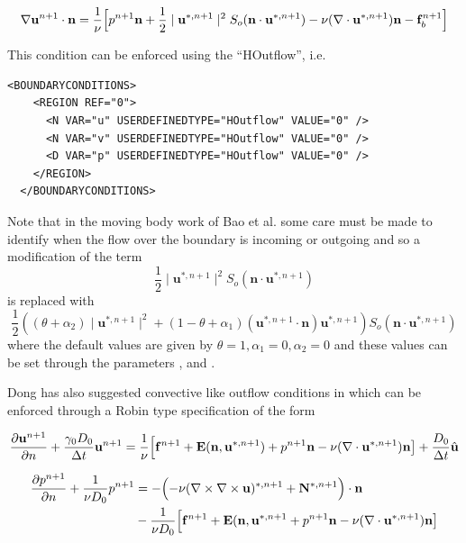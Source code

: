  \begin{equation}
 \nabla\mathbf{u}^{n+1}\cdot\mathbf{n}=\frac{1}{\nu}\Bigl[p^{n+1}\mathbf{n}+\frac{1}{2}
   \mid \mathbf{u}^{*,n+1} \mid^2 S_o(\mathbf{n}\cdot
   \mathbf{u}^{*,n+1})-\nu(\nabla\cdot\mathbf{u}^{*,n+1})\mathbf{n}-\mathbf{f}_b^{n+1}\Bigr]
 \end{equation}

This condition can be enforced using the  ``HOutflow'', i.e. 
\begin{lstlisting}[style=XMLStyle]
  <BOUNDARYCONDITIONS>
    <REGION REF="0">
      <N VAR="u" USERDEFINEDTYPE="HOutflow" VALUE="0" />
      <N VAR="v" USERDEFINEDTYPE="HOutflow" VALUE="0" />
      <D VAR="p" USERDEFINEDTYPE="HOutflow" VALUE="0" />
    </REGION>
  </BOUNDARYCONDITIONS>
\end{lstlisting}

Note that in the moving body work of Bao et al. \cite{BaPlGrSh16}
some care must be made to identify when the flow over the boundary is
incoming or outgoing and so a modification of the term
\[
\frac{1}{2}
   \mid \mathbf{u}^{*,n+1} \mid^2 S_o(\mathbf{n}\cdot
   \mathbf{u}^{*,n+1})
\]
is replaced with
\[
   \frac{1}{2} \left ( (\theta + \alpha_2)
   \mid \mathbf{u}^{*,n+1} \mid^2 + (1-\theta + \alpha_1) 
( \mathbf{u}^{*,n+1} \cdot \mathbf{n})  \mathbf{u}^{*,n+1} \right )
   S_o(\mathbf{n}\cdot
   \mathbf{u}^{*,n+1})
\]
where the default values are given by $\theta = 1,\alpha_1 = 0,\alpha_2 = 0$ and these values can be set through the parameters ,
 and . 

Dong has also suggested convective like outflow conditions in
\cite{Dong15} which can be enforced through a Robin type specification
of the form

\begin{equation}
  \frac{\partial \mathbf{u}^{n+1}}{\partial n} + \frac{\gamma_0 D_0}{\Delta t} \mathbf{u}^{n+1} = \frac{1}{\nu}\Bigl[\mathbf{f}^{n+1} + \mathbf{E}(\mathbf{n},\mathbf{u}^{*,n+1}) + p^{n+1}\mathbf{n} -\nu(\nabla\cdot \mathbf{u}^{*,n+1}) \mathbf{n}
    \bigr] + \frac{D_0}{\Delta t}\hat{\mathbf{u}}
 \end{equation}

\begin{align}
  \frac{\partial p^{n+1}}{\partial n} + \frac{1}{\nu D_0} p^{n+1} &=
   - \Bigl( -\nu (\nabla \times \nabla \times   \mathbf{u})^{*,n+1} + \mathbf{N}^{*,n+1}\Bigr)\cdot \mathbf{n} \nonumber \\
 & - \frac{1}{\nu D_0}\Bigl[\mathbf{f}^{n+1} + \mathbf{E}(\mathbf{n},\mathbf{u}^{*,n+1} + p^{n+1}\mathbf{n} -\nu(\nabla\cdot \mathbf{u}^{*,n+1}) \mathbf{n}
   \bigr] 
 \end{align}


